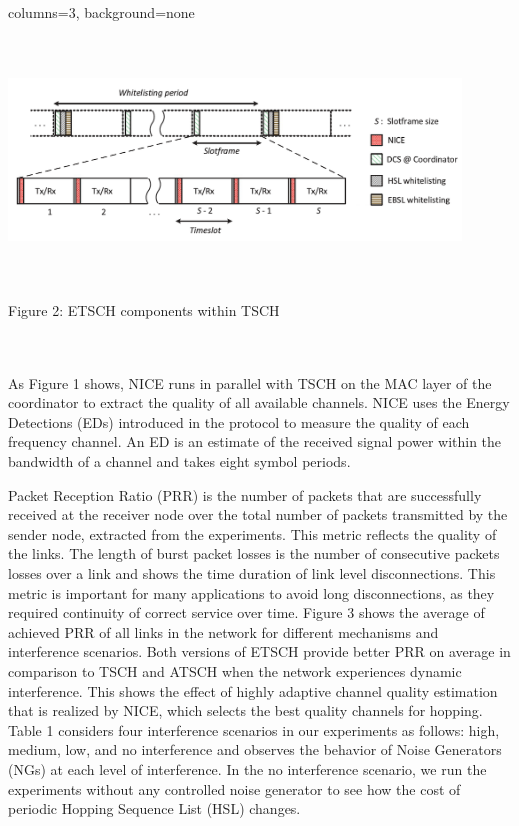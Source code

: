 \documentclass[portrait,paperwidth=91cm,paperheight=121cm,fontscale=0.35]{baposter} %
\begin{document}
\begin{poster}{columns=3, background=none}
{\begin{minipage}[mac]{0.65\linewidth}
\begin{minipage}[white]{0.44\linewidth}
                    \includegraphics[height=6.5cm,width=12cm, scale=.30]{whitelisting.png}
                    \hspace{3cm}
                    \caption{Figure 2: ETSCH components within TSCH }
                    \label{fig:white}
              \end{minipage}
\end{minipage}
\\\\
As Figure 1 shows, NICE runs in parallel with TSCH on the MAC layer of the coordinator to extract
the quality of all available channels. NICE uses the Energy Detections (EDs) introduced in the protocol to measure
the quality of each frequency channel. An ED is an estimate of the received signal power within
the bandwidth of a channel and takes eight symbol periods.
}
{Packet Reception Ratio (PRR)
is the number of packets that are successfully received at the receiver node over the total number
of packets transmitted by the sender node, extracted from the experiments. This metric reflects the
quality of the links. The length of burst packet losses is the number of consecutive packets losses
over a link and shows the time duration of link level disconnections. This metric is important for
many applications to avoid long disconnections, as they required continuity of correct service over
time. Figure 3 shows the average of achieved PRR of all links in the network for different mechanisms
and interference scenarios. Both versions of ETSCH provide better PRR on average in comparison
to TSCH and ATSCH when the network experiences dynamic interference. This shows the effect
of highly adaptive channel quality estimation that is realized by NICE, which selects the best
quality channels for hopping. Table 1 considers four interference scenarios in our experiments as follows: high, medium, low, and no interference and observes the behavior of Noise Generators (NGs) at each level of interference. In the no interference scenario, we run the experiments without any controlled
noise generator to see how the cost of periodic Hopping Sequence List (HSL) changes.\\

}
\end{poster}
\end{document}
